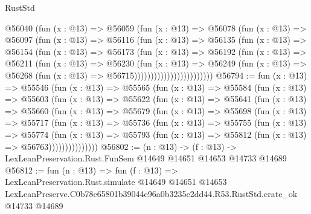 \begin{lexlean}{RustStd}
\begin{coremodule}
                        @56040
                          (fun (x : @13) =>
                          @56059
                            (fun (x : @13) =>
                            @56078
                              (fun (x : @13) =>
                              @56097
                                (fun (x : @13) =>
                                @56116
                                  (fun (x : @13) =>
                                  @56135
                                    (fun (x : @13) =>
                                    @56154
                                      (fun (x : @13) =>
                                      @56173
                                        (fun (x : @13) =>
                                        @56192
                                          (fun (x : @13) =>
                                          @56211
                                            (fun (x : @13) =>
                                            @56230
                                              (fun (x : @13) =>
                                              @56249
                                                (fun (x : @13) =>
                                                @56268
                                                  (fun (x : @13) => @56715))))))))))))))))))))))))
@56794 := fun (x : @13) =>
  @55546
    (fun (x : @13) =>
    @55565
      (fun (x : @13) =>
      @55584
        (fun (x : @13) =>
        @55603
          (fun (x : @13) =>
          @55622
            (fun (x : @13) =>
            @55641
              (fun (x : @13) =>
              @55660
                (fun (x : @13) =>
                @55679
                  (fun (x : @13) =>
                  @55698
                    (fun (x : @13) =>
                    @55717
                      (fun (x : @13) =>
                      @55736
                        (fun (x : @13) =>
                        @55755
                          (fun (x : @13) =>
                          @55774
                            (fun (x : @13) =>
                            @55793 (fun (x : @13) => @55812 (fun (x : @13) => @56763)))))))))))))))
@56802 := (n : @13) ->
  (f : @13) -> LexLeanPreservation.Rust.FunSem @14649 @14651 @14653 @14733 @14689
@56812 := fun (n : @13) =>
  fun (f : @13) =>
  LexLeanPreservation.Rust.simulate
    @14649
    @14651
    @14653
    LexLeanPreserve.C0b78c65801b39044e96a0b3235c2dd44.R53.RustStd.crate_ok
    @14733
    @14689
\end{coremodule}
\end{lexlean}
